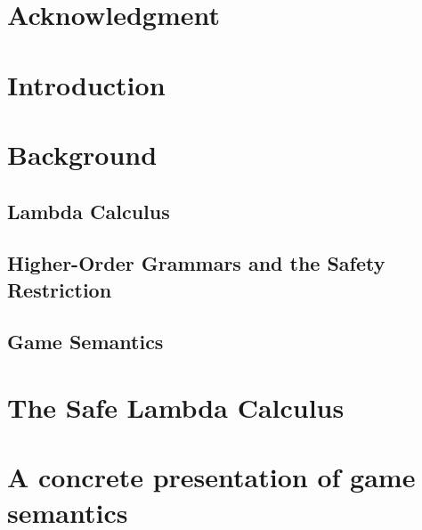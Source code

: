 \begin{romanpages}
\tableofcontents
\listoffigures
\listoftables
\end{romanpages}

\listoftodos
\bigskip

\chapter*{Acknowledgment}
%

\chapter{Introduction}



\chapter{Background}
    \section{Lambda Calculus}
    

    \section{Higher-Order Grammars and the Safety Restriction}
    

    

    \section{Game Semantics}
    

\chapter{The Safe Lambda Calculus}
\label{chap:safelambda}
    
    
    
    
    
    


\chapter{A concrete presentation of game semantics}
    \label{chap:concrete_gamesem}
    

